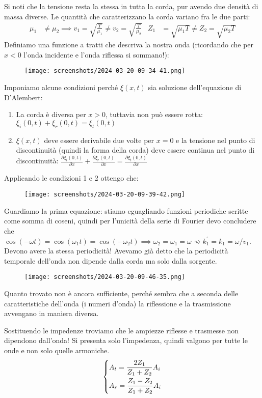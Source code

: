 Si noti che la tensione resta la stessa in tutta la corda, pur avendo due densità di massa diverse. Le quantità che caratterizzano la corda variano fra le due parti:
\begin{align}
	\mu _1 &\neq \mu _2 \implies v_1 = \sqrt{\frac{T}{\mu _1}} \neq v_2 = \sqrt{\frac{T}{\mu _2}} & Z_1&=\sqrt{\mu _1 T}\neq Z_2 = \sqrt{\mu _2 T}   
\end{align}
Definiamo una funzione a tratti che descriva la nostra onda (ricordando che per \(x <0\) l'onda incidente e l'onda riflessa si sommano!):
\begin{figure}[H]
	\centering
	\texttt{[image: screenshots/2024-03-20-09-34-41.png]}
\end{figure}
Imponiamo alcune condizioni perché \(\xi (x,t)\) sia soluzione dell'equazione di D'Alembert:
\begin{enumerate}
	\item La corda è diversa per \(x>0\), tuttavia non può essere rotta: \(\xi_i(0,t) + \xi _r (0,t) = \xi _t (0,t)\)
	\item \(\xi (x,t)\) deve essere derivabile due volte per \(x=0\) e la tensione nel punto di discontinuità (quindi la forma della corda) deve essere continua nel punto di discontinuità: \(\frac{\partial \xi _i (0,t)}{\partial x} + \frac{\partial \xi _r ( 0,t)}{\partial x} = \frac{\partial \xi _t (0,t)}{\partial x}  \)    
\end{enumerate}
Applicando le condizioni 1 e 2 ottengo che:
\begin{figure}[H]
	\centering
	\texttt{[image: screenshots/2024-03-20-09-39-42.png]}
\end{figure}
Guardiamo la prima equazione: stiamo eguagliando funzioni periodiche scritte come somma di coseni, quindi per l'unicità della serie di Fourier devo concludere che \(\cos (-\omega t) = \cos (\omega _1 t) = \cos (-\omega _2 t) \implies \omega _2 = \omega _1 = \omega \rightsquigarrow k_1^{\prime} =k_1 = \omega /v_1\). Devono avere la stessa periodicità! Avevamo già detto che la periodicità temporale dell'onda non dipende dalla corda ma solo dalla sorgente.
\begin{figure}[H]
	\centering
	\texttt{[image: screenshots/2024-03-20-09-46-35.png]}
\end{figure}
Quanto trovato non è ancora sufficiente, perché sembra che a seconda delle caratteristiche dell'onda (i numeri d'onda) la riflessione e la trasmissione avvengano in maniera diversa.
\begin{formula}
	Sostituendo le impedenze troviamo che le ampiezze riflesse e trasmesse non dipendono dall'onda! Si presenta solo l'impedenza, quindi valgono per tutte le onde e non solo quelle armoniche.
	\[
		\begin{dcases}
			A_t = \frac{2Z_1}{Z_1 + Z_2}A_i\\
			A_r = \frac{Z_1 - Z_2}{Z_1 + Z_2}A_i\\
		\end{dcases}
	\]
\end{formula}
